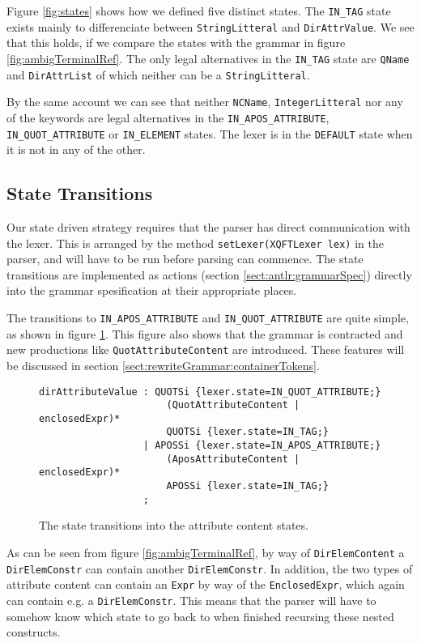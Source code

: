 Figure \ref{fig:states} shows how we defined five distinct states. The \verb!IN_TAG! state exists mainly to differenciate between \verb!StringLitteral! and \verb!DirAttrValue!. We see that this holds, if we compare the states with the grammar in figure \ref{fig:ambigTerminalRef}. The only legal alternatives in the \verb!IN_TAG! state are \verb!QName! and \verb!DirAttrList! of which neither can be a \verb!StringLitteral!. 

By the same account we can see that neither \verb!NCName!, \verb!IntegerLitteral! nor any of the keywords are legal alternatives in the \verb!IN_APOS_ATTRIBUTE!, \verb!IN_QUOT_ATTRIBUTE! or \verb!IN_ELEMENT! states. The lexer is in the \verb!DEFAULT! state when it is not in any of the other.

\subsection{State Transitions}
\label{sect:rewriteGrammar:transitions}
Our state driven strategy requires that the parser has direct communication with the lexer. This is arranged by the method \verb!setLexer(XQFTLexer lex)! in the parser, and will have to be run before parsing can commence. The state transitions are implemented as actions (section \ref{sect:antlr:grammarSpec}) directly into the grammar spesification at their appropriate places. 

The transitions to \verb!IN_APOS_ATTRIBUTE! and \verb!IN_QUOT_ATTRIBUTE! are quite simple, as shown in figure \ref{fig:transitionSimple}. This figure also shows that the grammar is contracted and new productions like \verb!QuotAttributeContent! are introduced. These features will be discussed in section \ref{sect:rewriteGrammar:containerTokens}.
\begin{figure}[h!]
\begin{Verbatim}
dirAttributeValue : QUOTSi {lexer.state=IN_QUOT_ATTRIBUTE;}
                      (QuotAttributeContent | enclosedExpr)* 
                      QUOTSi {lexer.state=IN_TAG;}
                  | APOSSi {lexer.state=IN_APOS_ATTRIBUTE;}
                      (AposAttributeContent | enclosedExpr)* 
                      APOSSi {lexer.state=IN_TAG;}
                  ; 
\end{Verbatim}
\caption[Attribute content state transitions.]{The state transitions into the attribute content states.}
\label{fig:transitionSimple}
\end{figure}

As can be seen from figure \ref{fig:ambigTerminalRef}, by way of \verb!DirElemContent! a \verb!DirElemConstr! can contain another \verb!DirElemConstr!. In addition, the two types of attribute content can contain an \verb!Expr! by way of the \verb!EnclosedExpr!, which again can contain e.g. a \verb!DirElemConstr!. This means that the parser will have to somehow know which state to go back to when finished recursing these nested constructs. 

